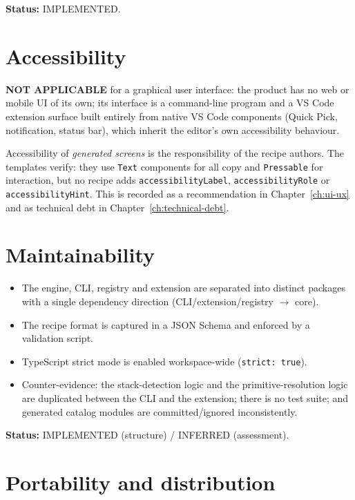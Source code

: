 \textbf{Status:} IMPLEMENTED.

\section{Accessibility}

\textbf{NOT APPLICABLE} for a graphical user interface: the product has no web or
mobile UI of its own; its interface is a command-line program and a VS Code
extension surface built entirely from native VS Code components (Quick Pick,
notification, status bar), which inherit the editor's own accessibility
behaviour.

Accessibility of \emph{generated screens} is the responsibility of the recipe
authors. The templates verify: they use \texttt{Text} components for all copy and
\texttt{Pressable} for interaction, but no recipe adds
\texttt{accessibilityLabel}, \texttt{accessibilityRole} or
\texttt{accessibilityHint}. This is recorded as a recommendation in
Chapter~\ref{ch:ui-ux} and as technical debt in Chapter~\ref{ch:technical-debt}.

\section{Maintainability}

\begin{itemize}
  \item The engine, CLI, registry and extension are separated into distinct
        packages with a single dependency direction
        (CLI/extension/registry $\rightarrow$ core).
  \item The recipe format is captured in a JSON Schema and enforced by a
        validation script.
  \item TypeScript strict mode is enabled workspace-wide
        (\texttt{strict: true}).
  \item Counter-evidence: the stack-detection logic and the primitive-resolution
        logic are duplicated between the CLI and the extension; there is no test
        suite; and generated catalog modules are committed/ignored inconsistently.
\end{itemize}

\textbf{Status:} IMPLEMENTED (structure) / INFERRED (assessment).

\section{Portability and distribution}

